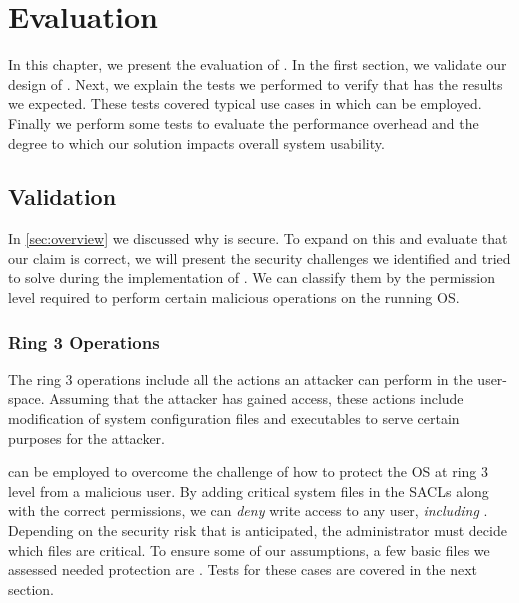 \acresetall
\chapter{Evaluation}\label{ch:chapter4}

In this chapter, we present the evaluation of . In the first section, we validate our design of . Next, we explain the tests we performed to verify that  has the results we expected. These tests covered typical use cases in which  can be employed. Finally we perform some tests to evaluate the performance overhead and the degree to which our solution impacts overall system usability.

\section{Validation}\label{sec:validation}

\par In \ref{sec:overview} we discussed why  is secure. To expand on this and evaluate that our claim is correct, we will present the security challenges we identified and tried to solve during the implementation of . We can classify them by the permission level required to perform certain malicious operations on the running \ac{OS}. 

\subsection{Ring 3 Operations}

\par The ring 3 operations include all the actions an attacker can perform in the user-space. Assuming that the attacker has gained  access, these actions include modification of system configuration files and executables to serve certain purposes for the attacker. 
\par {} can be employed to overcome the challenge of how to protect the \ac{OS} at ring 3 level from a malicious  user. By adding critical system files in the \acp{SACL} along with the correct permissions, we can \emph{deny} write access to any user, \emph{including} . Depending on the security risk that is anticipated, the administrator must decide which files are critical. To ensure some of our assumptions, a few basic files we assessed needed protection are . Tests for these cases are covered in the next section.

